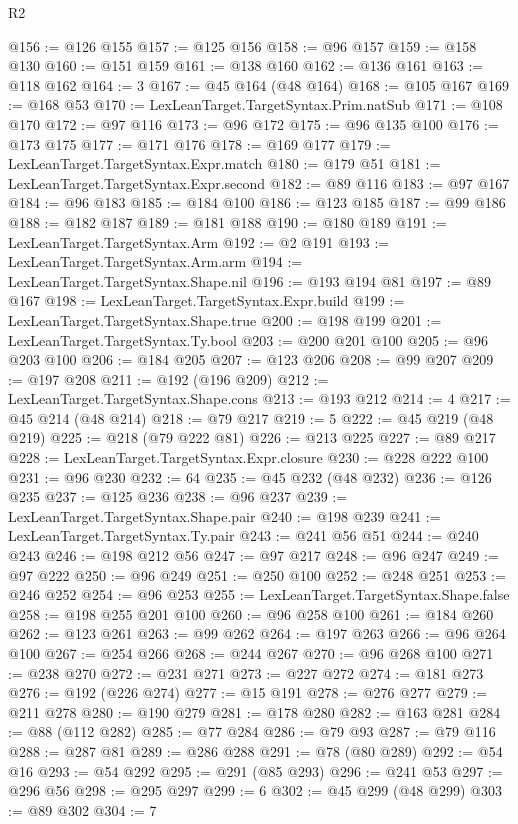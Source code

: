 \begin{lexlean}{R2}
\begin{coremodule}
@156 := @126 @155
@157 := @125 @156
@158 := @96 @157
@159 := @158 @130
@160 := @151 @159
@161 := @138 @160
@162 := @136 @161
@163 := @118 @162
@164 := 3
@167 := @45 @164 (@48 @164)
@168 := @105 @167
@169 := @168 @53
@170 := LexLeanTarget.TargetSyntax.Prim.natSub
@171 := @108 @170
@172 := @97 @116
@173 := @96 @172
@175 := @96 @135 @100
@176 := @173 @175
@177 := @171 @176
@178 := @169 @177
@179 := LexLeanTarget.TargetSyntax.Expr.match
@180 := @179 @51
@181 := LexLeanTarget.TargetSyntax.Expr.second
@182 := @89 @116
@183 := @97 @167
@184 := @96 @183
@185 := @184 @100
@186 := @123 @185
@187 := @99 @186
@188 := @182 @187
@189 := @181 @188
@190 := @180 @189
@191 := LexLeanTarget.TargetSyntax.Arm
@192 := @2 @191
@193 := LexLeanTarget.TargetSyntax.Arm.arm
@194 := LexLeanTarget.TargetSyntax.Shape.nil
@196 := @193 @194 @81
@197 := @89 @167
@198 := LexLeanTarget.TargetSyntax.Expr.build
@199 := LexLeanTarget.TargetSyntax.Shape.true
@200 := @198 @199
@201 := LexLeanTarget.TargetSyntax.Ty.bool
@203 := @200 @201 @100
@205 := @96 @203 @100
@206 := @184 @205
@207 := @123 @206
@208 := @99 @207
@209 := @197 @208
@211 := @192 (@196 @209)
@212 := LexLeanTarget.TargetSyntax.Shape.cons
@213 := @193 @212
@214 := 4
@217 := @45 @214 (@48 @214)
@218 := @79 @217
@219 := 5
@222 := @45 @219 (@48 @219)
@225 := @218 (@79 @222 @81)
@226 := @213 @225
@227 := @89 @217
@228 := LexLeanTarget.TargetSyntax.Expr.closure
@230 := @228 @222 @100
@231 := @96 @230
@232 := 64
@235 := @45 @232 (@48 @232)
@236 := @126 @235
@237 := @125 @236
@238 := @96 @237
@239 := LexLeanTarget.TargetSyntax.Shape.pair
@240 := @198 @239
@241 := LexLeanTarget.TargetSyntax.Ty.pair
@243 := @241 @56 @51
@244 := @240 @243
@246 := @198 @212 @56
@247 := @97 @217
@248 := @96 @247
@249 := @97 @222
@250 := @96 @249
@251 := @250 @100
@252 := @248 @251
@253 := @246 @252
@254 := @96 @253
@255 := LexLeanTarget.TargetSyntax.Shape.false
@258 := @198 @255 @201 @100
@260 := @96 @258 @100
@261 := @184 @260
@262 := @123 @261
@263 := @99 @262
@264 := @197 @263
@266 := @96 @264 @100
@267 := @254 @266
@268 := @244 @267
@270 := @96 @268 @100
@271 := @238 @270
@272 := @231 @271
@273 := @227 @272
@274 := @181 @273
@276 := @192 (@226 @274)
@277 := @15 @191
@278 := @276 @277
@279 := @211 @278
@280 := @190 @279
@281 := @178 @280
@282 := @163 @281
@284 := @88 (@112 @282)
@285 := @77 @284
@286 := @79 @93
@287 := @79 @116
@288 := @287 @81
@289 := @286 @288
@291 := @78 (@80 @289)
@292 := @54 @16
@293 := @54 @292
@295 := @291 (@85 @293)
@296 := @241 @53
@297 := @296 @56
@298 := @295 @297
@299 := 6
@302 := @45 @299 (@48 @299)
@303 := @89 @302
@304 := 7

\end{coremodule}
\end{lexlean}
